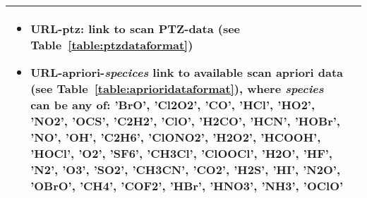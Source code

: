 \begin{table}
\begin{longtable}{| p{} | p{} |}
\begin{itemize}
                             \item URL-ptz: link to scan PTZ-data (see Table~\ref{table:ptzdataformat})
                             \item URL-apriori-\textit{specices} link to available scan apriori data 
                              (see Table~\ref{table:aprioridataformat}),
                              where \textit{species} can be any of: 'BrO', 'Cl2O2', 'CO', 'HCl', 'HO2', 'NO2',
                              'OCS', 'C2H2', 'ClO', 'H2CO', 'HCN', 'HOBr', 'NO', 'OH', 'C2H6', 'ClONO2', 'H2O2',
                              'HCOOH', 'HOCl', 'O2', 'SF6', 'CH3Cl', 'ClOOCl', 'H2O', 'HF', 'N2', 'O3', 'SO2',
                              'CH3CN', 'CO2', 'H2S', 'HI', 'N2O', 'OBrO', 'CH4', 'COF2', 'HBr', 'HNO3', 'NH3', 'OClO'
                            \end{itemize}
\\ \hline
                                
\hline
\end{longtable}
\end{table}
\addtocounter{table}{-1}
  


\clearpage
\newpage

